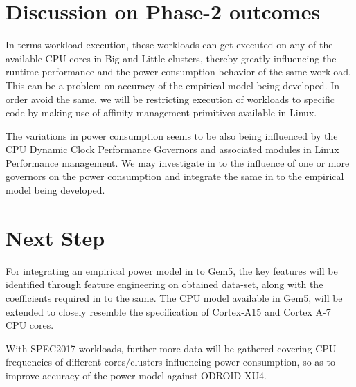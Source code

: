 \documentclass[conference]{IEEEtran}
\begin{document}
\section{ Discussion on Phase-2 outcomes}
    \par In terms workload execution, these workloads can get executed on any of the available CPU cores in Big and Little clusters, thereby greatly influencing the runtime performance and the power consumption behavior of the same workload. This can be a problem on accuracy of the empirical model being developed. In order avoid the same, we will be restricting execution of workloads to specific code by making use of affinity management primitives available in Linux.

    \par The variations in power consumption seems to be also being influenced by the CPU Dynamic Clock Performance Governors \cite{10.1145/3167132.3167198} and associated modules in Linux Performance management. We may investigate in to the influence of one or more governors on the power consumption and integrate the same in to the empirical model being developed.

\section{Next Step}
    \par For integrating an empirical power model in to Gem5, the key features will be identified through feature engineering on obtained data-set, along with the coefficients required in to the same. The CPU model available in Gem5, will be extended to closely resemble the specification of Cortex-A15 and Cortex A-7 CPU cores.

    \par With SPEC2017 workloads, further more data will be gathered covering CPU frequencies of different cores/clusters influencing power consumption, so as to improve accuracy of the power model against ODROID-XU4.




\end{document}
